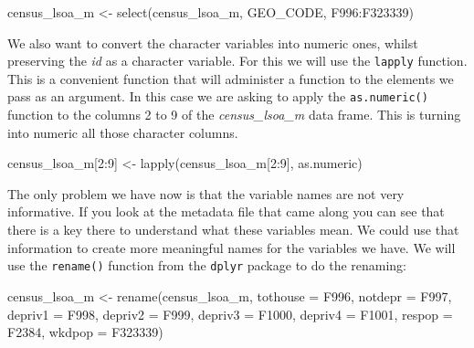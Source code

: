 \documentclass[
]{book}
\newenvironment{Shaded}{\begin{snugshade}}{\end{snugshade}}
\newcommand{\AttributeTok}[1]{\textcolor[rgb]{0.77,0.63,0.00}{#1}}
\newcommand{\DecValTok}[1]{\textcolor[rgb]{0.00,0.00,0.81}{#1}}
\newcommand{\FunctionTok}[1]{\textcolor[rgb]{0.00,0.00,0.00}{#1}}
\newcommand{\NormalTok}[1]{#1}
\newcommand{\OtherTok}[1]{\textcolor[rgb]{0.56,0.35,0.01}{#1}}
\newcommand{\SpecialCharTok}[1]{\textcolor[rgb]{0.00,0.00,0.00}{#1}}
\begin{document}
\begin{Shaded}
\begin{Highlighting}[]
\NormalTok{census\_lsoa\_m }\OtherTok{\textless{}{-}} \FunctionTok{select}\NormalTok{(census\_lsoa\_m, GEO\_CODE, F996}\SpecialCharTok{:}\NormalTok{F323339)}
\end{Highlighting}
\end{Shaded}

We also want to convert the character variables into numeric ones, whilst preserving the \emph{id} as a character variable. For this we will use the \texttt{lapply} function. This is a convenient function that will administer a function to the elements we pass as an argument. In this case we are asking to apply the \texttt{as.numeric()} function to the columns 2 to 9 of the \emph{census\_lsoa\_m} data frame. This is turning into numeric all those character columns.

\begin{Shaded}
\begin{Highlighting}[]
\NormalTok{census\_lsoa\_m[}\DecValTok{2}\SpecialCharTok{:}\DecValTok{9}\NormalTok{] }\OtherTok{\textless{}{-}} \FunctionTok{lapply}\NormalTok{(census\_lsoa\_m[}\DecValTok{2}\SpecialCharTok{:}\DecValTok{9}\NormalTok{], as.numeric)}
\end{Highlighting}
\end{Shaded}

The only problem we have now is that the variable names are not very informative. If you look at the metadata file that came along you can see that there is a key there to understand what these variables mean. We could use that information to create more meaningful names for the variables we have. We will use the \texttt{rename()} function from the \texttt{dplyr} package to do the renaming:

\begin{Shaded}
\begin{Highlighting}[]
\NormalTok{census\_lsoa\_m }\OtherTok{\textless{}{-}} \FunctionTok{rename}\NormalTok{(census\_lsoa\_m, }\AttributeTok{tothouse =}\NormalTok{ F996, }\AttributeTok{notdepr =}\NormalTok{ F997, }\AttributeTok{depriv1 =}\NormalTok{ F998,}
                        \AttributeTok{depriv2 =}\NormalTok{ F999, }\AttributeTok{depriv3 =}\NormalTok{ F1000, }\AttributeTok{depriv4 =}\NormalTok{ F1001, }\AttributeTok{respop =}\NormalTok{ F2384,}
                        \AttributeTok{wkdpop =}\NormalTok{ F323339)}
\end{Highlighting}
\end{Shaded}
\end{document}
